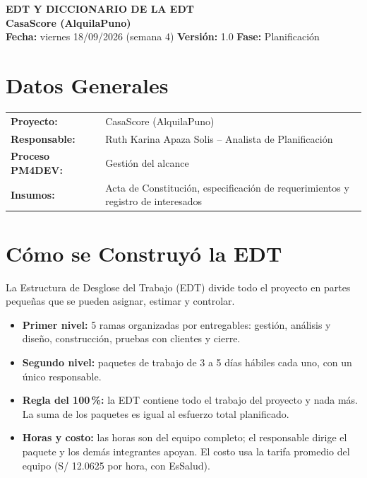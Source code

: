 \documentclass[11pt,a4paper]{article}
\begin{document}
\begin{center}
    {\Large \textbf{\textcolor{AzulUNA}{EDT Y DICCIONARIO DE LA EDT}}}\\[3pt]
    {\normalsize \textbf{CasaScore (AlquilaPuno)}}\\[4pt]
    \footnotesize \textbf{Fecha:} viernes 18/09/2026 (semana 4) \quad \textbar\quad \textbf{Versión:} 1.0 \quad \textbar\quad \textbf{Fase:} Planificación
\end{center}

\vspace{0.1cm}

\section{Datos Generales}
\noindent\begin{tabularx}{\textwidth}{@{}P{4.2cm} L@{}}
\toprule
\textbf{Proyecto:} & CasaScore (AlquilaPuno) \\
\textbf{Responsable:} & Ruth Karina Apaza Solis -- Analista de Planificación \\
\textbf{Proceso PM4DEV:} & Gestión del alcance \\
\textbf{Insumos:} & Acta de Constitución, especificación de requerimientos y registro de interesados \\
\bottomrule
\end{tabularx}

\section{Cómo se Construyó la EDT}
La Estructura de Desglose del Trabajo (EDT) divide todo el proyecto en partes pequeñas que se pueden asignar, estimar y controlar.
\begin{itemize}[leftmargin=*]
    \item \textbf{Primer nivel:} 5 ramas organizadas por entregables: gestión, análisis y diseño, construcción, pruebas con clientes y cierre.
    \item \textbf{Segundo nivel:} paquetes de trabajo de 3 a 5 días hábiles cada uno, con un único responsable.
    \item \textbf{Regla del 100\,\%:} la EDT contiene todo el trabajo del proyecto y nada más. La suma de los paquetes es igual al esfuerzo total planificado.
    \item \textbf{Horas y costo:} las horas son del equipo completo; el responsable dirige el paquete y los demás integrantes apoyan. El costo usa la tarifa promedio del equipo (S/ 12.0625 por hora, con EsSalud).
\end{itemize}
\end{document}
